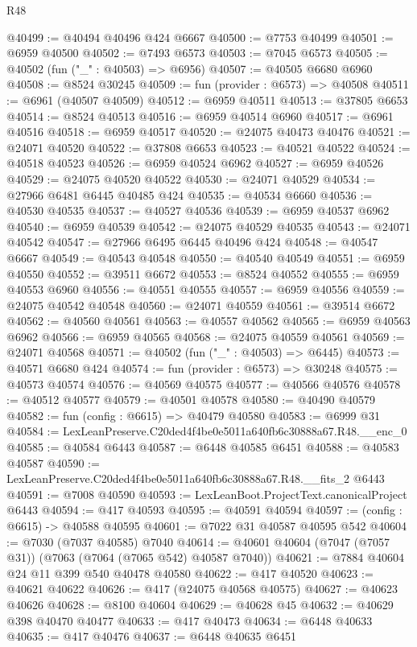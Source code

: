 \begin{lexlean}{R48}
\begin{coremodule}
@40499 := @40494 @40496 @424 @6667
@40500 := @7753 @40499
@40501 := @6959 @40500
@40502 := @7493 @6573
@40503 := @7045 @6573
@40505 := @40502 (fun ("_" : @40503) => @6956)
@40507 := @40505 @6680 @6960
@40508 := @8524 @30245
@40509 := fun (provider : @6573) => @40508
@40511 := @6961 (@40507 @40509)
@40512 := @6959 @40511
@40513 := @37805 @6653
@40514 := @8524 @40513
@40516 := @6959 @40514 @6960
@40517 := @6961 @40516
@40518 := @6959 @40517
@40520 := @24075 @40473 @40476
@40521 := @24071 @40520
@40522 := @37808 @6653
@40523 := @40521 @40522
@40524 := @40518 @40523
@40526 := @6959 @40524 @6962
@40527 := @6959 @40526
@40529 := @24075 @40520 @40522
@40530 := @24071 @40529
@40534 := @27966 @6481 @6445 @40485 @424
@40535 := @40534 @6660
@40536 := @40530 @40535
@40537 := @40527 @40536
@40539 := @6959 @40537 @6962
@40540 := @6959 @40539
@40542 := @24075 @40529 @40535
@40543 := @24071 @40542
@40547 := @27966 @6495 @6445 @40496 @424
@40548 := @40547 @6667
@40549 := @40543 @40548
@40550 := @40540 @40549
@40551 := @6959 @40550
@40552 := @39511 @6672
@40553 := @8524 @40552
@40555 := @6959 @40553 @6960
@40556 := @40551 @40555
@40557 := @6959 @40556
@40559 := @24075 @40542 @40548
@40560 := @24071 @40559
@40561 := @39514 @6672
@40562 := @40560 @40561
@40563 := @40557 @40562
@40565 := @6959 @40563 @6962
@40566 := @6959 @40565
@40568 := @24075 @40559 @40561
@40569 := @24071 @40568
@40571 := @40502 (fun ("_" : @40503) => @6445)
@40573 := @40571 @6680 @424
@40574 := fun (provider : @6573) => @30248
@40575 := @40573 @40574
@40576 := @40569 @40575
@40577 := @40566 @40576
@40578 := @40512 @40577
@40579 := @40501 @40578
@40580 := @40490 @40579
@40582 := fun (config : @6615) => @40479 @40580
@40583 := @6999 @31
@40584 := LexLeanPreserve.C20ded4f4be0e5011a640fb6c30888a67.R48.__enc_0
@40585 := @40584 @6443
@40587 := @6448 @40585 @6451
@40588 := @40583 @40587
@40590 := LexLeanPreserve.C20ded4f4be0e5011a640fb6c30888a67.R48.__fits_2 @6443
@40591 := @7008 @40590
@40593 := LexLeanBoot.ProjectText.canonicalProject @6443
@40594 := @417 @40593
@40595 := @40591 @40594
@40597 := (config : @6615) -> @40588 @40595
@40601 := @7022 @31 @40587 @40595 @542
@40604 := @7030 (@7037 @40585) @7040
@40614 := @40601 @40604 (@7047 (@7057 @31)) (@7063 (@7064 (@7065 @542) @40587 @7040))
@40621 := @7884 @40604 @24 @11 @399 @540 @40478 @40580
@40622 := @417 @40520
@40623 := @40621 @40622
@40626 := @417 (@24075 @40568 @40575)
@40627 := @40623 @40626
@40628 := @8100 @40604
@40629 := @40628 @45
@40632 := @40629 @398 @40470 @40477
@40633 := @417 @40473
@40634 := @6448 @40633
@40635 := @417 @40476
@40637 := @6448 @40635 @6451

\end{coremodule}
\end{lexlean}
